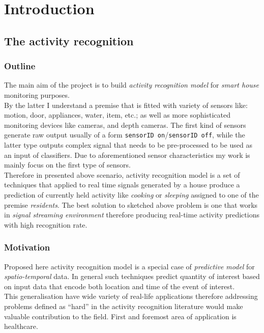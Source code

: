 \documentclass[12pt, a4paper, pdflatex, leqno, twoside, openright]{report}
\begin{document}
\chapter{Introduction\label{ch:introduction}} %
\setcounter{page}{1}

  \section{The activity recognition}
    \subsection{Outline} %
The main aim of the project is to build \emph{activity recognition model} for \emph{smart house} monitoring purposes.\\
By the latter I understand a premise that is fitted with variety of sensors like: motion, door, appliances, water, item, etc.; as well as more sophisticated monitoring devices like cameras, and depth cameras. The first kind of sensors generate raw output usually of a form \texttt{sensorID on}/\texttt{sensorID off}, while the latter type outputs complex signal that needs to be pre-processed to be used as an input of classifiers. Due to aforementioned sensor characteristics my work is mainly focus on the first type of sensors.\\
Therefore in presented above scenario, activity recognition model is a set of techniques that applied to real time signals generated by a house produce a prediction of currently held activity like \emph{cooking} or \emph{sleeping} assigned to one of the premise \emph{residents}. The best solution to sketched above problem is one that works in \emph{signal streaming environment} therefore producing real-time activity predictions with high recognition rate.

    \subsection{Motivation} %
Proposed here activity recognition model is a special case of \emph{predictive model} for \emph{spatio-temporal} data. In general such techniques predict quantity of interest based on input data that encode both location and time of the event of interest.\\
This generalisation have wide variety of real-life applications therefore addressing problems defined as ``hard'' in the activity recognition literature would make valuable contribution to the field. 
First and foremost area of application is healthcare.
\end{document}
